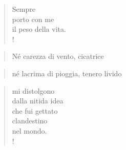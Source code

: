 
\begin{verse}
Sempre\\
porto con me\\
il peso della vita.\\!
\end{verse}

\begin{verse}Né carezza di vento, \hfill cicatrice \end{verse}
\vspace{-0.9cm}
\begin{verse}né lacrima di pioggia, \hfill tenero livido \end{verse}
\vspace{-0.9cm}

\begin{verse}
mi distolgono\\
dalla nitida idea\\
che fui gettato\\
clandestino\\
nel mondo.\\!
\end{verse}
